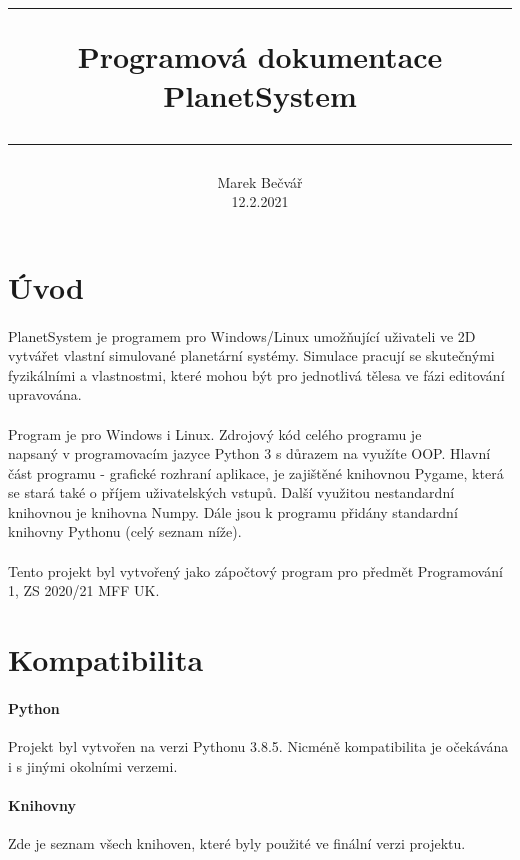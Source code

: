 \documentclass[a4paper, 12pt]{article}
\title{
        \vspace{1in}
        \rule{\linewidth}{0.5pt}
		\usefont{OT1}{bch}{b}{n}
        \huge Programová dokumentace \\PlanetSystem\\
        \vspace{-10pt}
        \rule{\linewidth}{1pt}
}
\author{
		\normalfont\normalsize
        Marek Bečvář\\[-3pt]\normalsize
        12.2.2021
}
\date{}
\begin{document}
\maketitle 
\newpage

\tableofcontents
\newpage

\section{Úvod}
\paragraph{}
PlanetSystem je programem pro Windows/Linux umožňující uživateli ve 2D vytvářet
vlastní simulované planetární systémy. Simulace pracují se skutečnými
fyzikálními a vlastnostmi, které mohou být pro jednotlivá tělesa ve fázi
editování upravována.
\\\\
Program je pro Windows i Linux. Zdrojový kód celého programu je \\napsaný v
programovacím jazyce Python 3 s důrazem na využíte OOP.  Hlavní část programu -
grafické rozhraní aplikace, je zajištěné knihovnou Pygame, která se stará také
o příjem uživatelských vstupů. Další využitou nestandardní knihovnou je
knihovna Numpy. Dále jsou k programu přidány standardní knihovny Pythonu (celý
seznam níže).  
\\\\
Tento projekt byl vytvořený jako zápočtový program pro předmět Programování 1,
ZS 2020/21 MFF UK. 

\section{Kompatibilita}
\paragraph{Python} Projekt byl vytvořen na verzi Pythonu 3.8.5. Nicméně
kompatibilita je očekávána i s jinými okolními verzemi. 

\paragraph{Knihovny} Zde je seznam všech knihoven, 
které byly použité ve finální verzi projektu.
\end{document}
